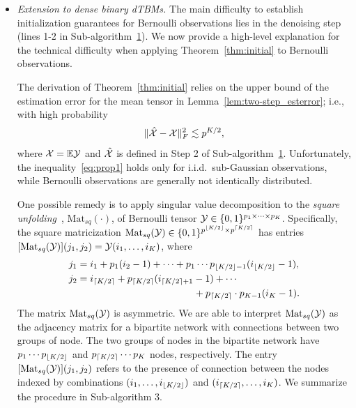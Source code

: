 \documentclass[journal]{IEEEtran}
\theoremstyle{definition}
\theoremstyle{definition}
\newcommand{\Mat}{\text{Mat}}
\DeclarePairedDelimiter{\ceil}{\lceil}{\rceil}
\DeclarePairedDelimiter{\floor}{\lfloor}{\rfloor}
\begin{document}
\begin{itemize}[wide]
    \item \textit{Extension to dense binary dTBMs.} The main difficulty to establish initialization guarantees for Bernoulli observations lies in the denoising step (lines 1-2 in Sub-algorithm~\hyperref[alg:main]{1}). We now provide a high-level explanation for the technical difficulty when applying Theorem~\ref{thm:initial} to Bernoulli observations. 
    
    
    The derivation of Theorem~\ref{thm:initial} relies on the upper bound of the estimation error for the mean tensor in Lemma~\ref{lem:two-step_esterror}; i.e., with high probability
\begin{equation}\label{eq:prop1}
    \onormSize{}{\hat \tX - \tX}_F^2 \lesssim p^{K/2},
\end{equation}
where $\mathcal{X} = \mathbb{E}\mathcal{Y}$ and $\hat {\mathcal{X}}$ is defined in Step 2 of Sub-algorithm~\hyperref[alg:main]{1}. Unfortunately, the inequality~\eqref{eq:prop1} holds only for i.i.d.\ sub-Gaussian observations, while Bernoulli observations are generally not identically distributed.  

One possible remedy is to apply singular value decomposition to the \emph{square unfolding}~\citep{mu2014square}, $\Mat_{sq}(\cdot)$, of Bernoulli tensor $\mathcal{Y} \in \{0,1\}^{p_1 \times \cdots \times p_K}$. Specifically, the square matricization $\mat_{sq} (\tY) \in \{0,1\}^{p^{\floor{K/2}} \times p^{\ceil{K/2}} }$ has entries $[\Mat_{sq}(\tY)](j_1, j_2) = \tY(i_1, \ldots, i_K)$, where
\begin{align}
    j_1 &= i_1 + p_1(i_2 - 1) + \cdots + p_1 \cdots p_{\floor{K/2}-1} (i_{\floor{K/2}} - 1),\\
    j_2 &= i_{\ceil{K/2}} + p_{ \ceil{K/2}}(i_{\ceil{K/2} + 1} - 1) + \cdots \\
    & \quad \quad \quad \quad \quad \quad \quad \quad \quad \quad \quad \quad + p_{ \ceil{K/2}} \cdot p_{K-1} (i_K-1).
\end{align}
The matrix $\Mat_{sq}(\tY)$ is asymmetric. We are able to interpret $\Mat_{sq}(\tY)$ as the adjacency matrix for a bipartite network with connections between two groups of node. The two groups of nodes in the bipartite network have $p_1 \cdots p_{\floor{K/2}}$ and $ p_{\ceil{K/2}} \cdots p_K$ nodes, respectively. The entry $[\Mat_{sq}(\tY)](j_1, j_2)$ refers to the presence of connection between the nodes indexed by combinations $(i_1, \ldots, i_{\floor{K/2}})$ and $(i_{\ceil{K/2}}, \ldots, i_K)$. We summarize the procedure in Sub-algorithm 3.


\end{itemize}
\end{document}
